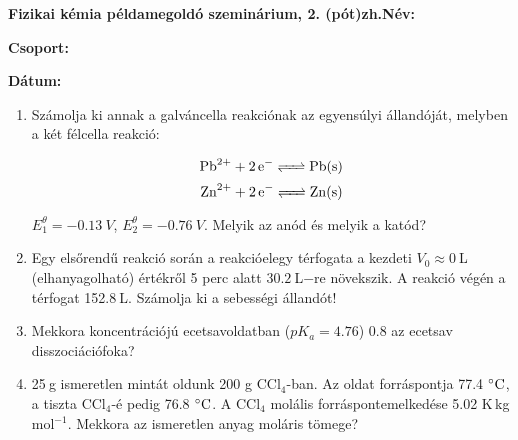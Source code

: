 \documentclass[a4paper, 11pt]{article}
\begin{document}
\textbf{Fizikai kémia példamegoldó szeminárium, 2. (pót)zh.}\hfill \textbf{Név:}

\hfill \textbf{Csoport:}

\hfill \textbf{Dátum:}

\thispagestyle{empty}

\begin{enumerate}

\item Számolja ki annak a galváncella reakciónak az egyensúlyi állandóját, melyben a két félcella reakció:
 
\begin{equation}
        \ce{Pb^{2+} + 2e^- <=> Pb(s)}
\end{equation}
\begin{equation}
        \ce{Zn^{2+} + 2e^- <=> Zn(s)}
\end{equation}

$E_1^\theta=-0.13~V$, $E_2^\theta=-0.76~V$. Melyik az anód és melyik a katód? 

\item Egy elsőrendű reakció során a reakcióelegy térfogata a kezdeti $V_0\approx0~$L (elhanyagolható) értékről 5 perc alatt $30.2~$L$-$re növekszik. A reakció végén a térfogat 152.8$~$L. Számolja ki a sebességi állandót!

\item Mekkora koncentrációjú ecetsavoldatban ($pK_a=4.76$) 0.8 az ecetsav disszociációfoka?

\item 25$~$g ismeretlen mintát oldunk 200 g CCl$_4$-ban. Az oldat forráspontja 77.4$~\celsius$, a tiszta CCl$_4$-é pedig 76.8$~\celsius$. A CCl$_4$ molális forráspontemelkedése 5.02 K$\,$kg$\,$mol$^{-1}$. Mekkora az ismeretlen anyag moláris tömege?

\end{enumerate}
\end{document}
